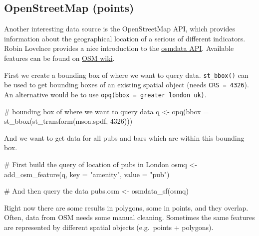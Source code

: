 \documentclass[
  letterpaper,
  DIV=11,
  numbers=noendperiod]{scrreprt}
\newenvironment{Shaded}{\begin{snugshade}}{\end{snugshade}}
\newcommand{\AttributeTok}[1]{\textcolor[rgb]{0.40,0.45,0.13}{#1}}
\newcommand{\CommentTok}[1]{\textcolor[rgb]{0.37,0.37,0.37}{#1}}
\newcommand{\DecValTok}[1]{\textcolor[rgb]{0.68,0.00,0.00}{#1}}
\newcommand{\FunctionTok}[1]{\textcolor[rgb]{0.28,0.35,0.67}{#1}}
\newcommand{\NormalTok}[1]{\textcolor[rgb]{0.00,0.23,0.31}{#1}}
\newcommand{\OtherTok}[1]{\textcolor[rgb]{0.00,0.23,0.31}{#1}}
\newcommand{\StringTok}[1]{\textcolor[rgb]{0.13,0.47,0.30}{#1}}
\begin{document}
\hypertarget{openstreetmap-points}{%
\subsection{OpenStreetMap (points)}\label{openstreetmap-points}}

Another interesting data source is the OpenStreetMap API, which provides
information about the geographical location of a serious of different
indicators. Robin Lovelace provides a nice introduction to the
\href{https://cran.r-project.org/web/packages/osmdata/vignettes/osmdata.html}{osmdata
API}. Available features can be found on
\href{https://wiki.openstreetmap.org/wiki/Map_features}{OSM wiki}.

First we create a bounding box of where we want to query data.
\texttt{st\_bbox()} can be used to get bounding boxes of an existing
spatial object (needs \texttt{CRS\ =\ 4326}). An alternative would be to
use
\texttt{opq(bbox\ =\ \textquotesingle{}greater\ london\ uk\textquotesingle{})}.

\begin{Shaded}
\begin{Highlighting}[]
\CommentTok{\# bounding box of where we want to query data}
\NormalTok{q }\OtherTok{\textless{}{-}} \FunctionTok{opq}\NormalTok{(}\AttributeTok{bbox =} \FunctionTok{st\_bbox}\NormalTok{(}\FunctionTok{st\_transform}\NormalTok{(msoa.spdf, }\DecValTok{4326}\NormalTok{)))}
\end{Highlighting}
\end{Shaded}

And we want to get data for all pubs and bars which are within this
bounding box.

\begin{Shaded}
\begin{Highlighting}[]
\CommentTok{\# First build the query of location of pubs in London}
\NormalTok{osmq }\OtherTok{\textless{}{-}} \FunctionTok{add\_osm\_feature}\NormalTok{(q, }\AttributeTok{key =} \StringTok{"amenity"}\NormalTok{, }\AttributeTok{value =} \StringTok{"pub"}\NormalTok{)}

\CommentTok{\# And then query the data}
\NormalTok{pubs.osm }\OtherTok{\textless{}{-}} \FunctionTok{osmdata\_sf}\NormalTok{(osmq)}
\end{Highlighting}
\end{Shaded}

Right now there are some results in polygons, some in points, and they
overlap. Often, data from OSM needs some manual cleaning. Sometimes the
same features are represented by different spatial objects (e.g.~points
+ polygons).
\end{document}
